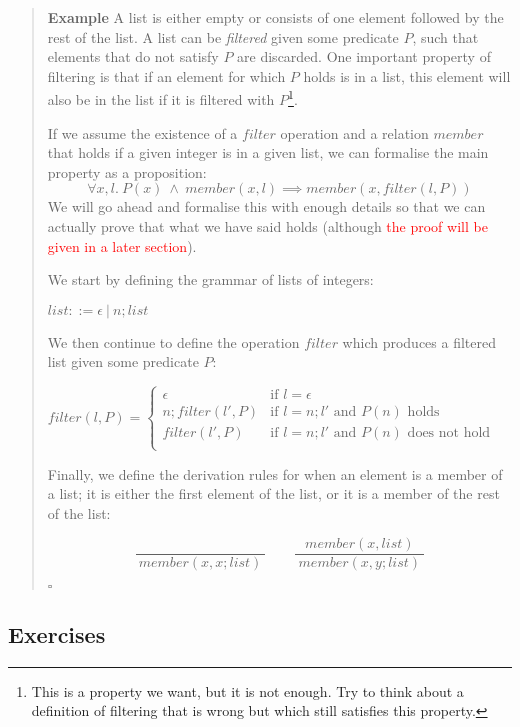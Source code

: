 \documentclass{tufte-handout}
\newcounter{example}
\newenvironment{example}
{\refstepcounter{example}\begin{quote}
\textbf{Example \arabic{example}}}
{

$\square$\end{quote}}
\newcommand{\RED}[1]{\textcolor{red}{#1}}
\begin{document}
\begin{example}
  A list is either empty or consists of one element followed by
  the rest of the list. A list can be \emph{filtered} given some
  predicate $P$, such that elements that do not satisfy $P$ are
  discarded. One important property of filtering is that if an
  element for which $P$ holds is in a list, this element will also
  be in the list if it is filtered with $P$\footnote{This is a
    property we want, but it is not enough. Try to think about a
    definition of filtering that is wrong but which still
    satisfies this property. }.

  If we assume the existence of a $\mathit{filter}$ operation and
  a relation $\mathit{member}$ that holds if a given integer is in
  a given list, we can formalise the main property as a
  proposition:
  \[
    \forall x, l.~P(x) ~\land~ \mathit{member}(x, l)
    \implies
    \mathit{member}(x, \mathit{filter}(l, P))
  \]
  We will go ahead and formalise this with enough details so that
  we can actually prove that what we have said holds (although
  \RED{the proof will be given in a later section}).

  We start by defining the grammar of lists of integers:

  $\mathit{list} ::= \epsilon ~|~ n; \mathit{list}$

  \noindent
  We then continue to define the operation $\mathit{filter}$ which
  produces a filtered list given some predicate $P$:

  $\mathit{filter(l, P)} =
  \begin{cases}
    \epsilon & \text{if } l = \epsilon\\
    n; \mathit{filter}(l', P) & \text{if } l = n; l' \text{ and } P(n) \text{ holds}\\
    \mathit{filter}(l', P) & \text{if } l = n; l' \text{ and } P(n) \text{ does not hold}\\
  \end{cases}$

  \noindent
  Finally, we define the derivation rules for when an element is a
  member of a list; it is either the first element of the list, or
  it is a member of the rest of the list:

  \[
    \frac{}{~\mathit{member}(x, x; \mathit{list})~}
    \qquad
    \frac{~\mathit{member}(x, \mathit{list})~}{~\mathit{member}(x, y; \mathit{list})~}
  \]

\end{example}

\subsection{Exercises}
\end{document}
